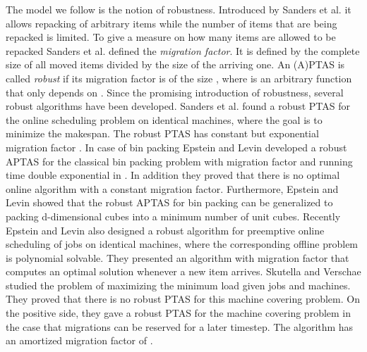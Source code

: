 \documentclass[a4paper,11pt]{article}
\begin{document}
The model we follow is the notion of robustness. Introduced by Sanders et al. \cite{sanders2009} it allows 
repacking of arbitrary items while the number of items that are being repacked is limited. To give a measure 
on how many items are allowed to
be repacked Sanders et al. \cite{sanders2009} defined the \emph{migration factor}.
It is defined by the complete size of all moved items divided by the size of the arriving one.
An (A)PTAS is called \emph{robust} if its migration factor is of the size , where  is
an arbitrary function that only depends on .
Since the promising introduction of robustness, several robust algorithms have been developed.
Sanders et al. \cite{sanders2009} found a robust PTAS for the online scheduling problem  
on identical machines, where the goal is to minimize the makespan. The robust PTAS has
constant but exponential migration factor .
In case of bin packing
Epstein and Levin \cite{epstein2006robust} developed a robust APTAS for the classical bin packing problem
with migration factor  and running time
double exponential in .
In addition they proved that there is no optimal online algorithm with a constant migration factor.
Furthermore, Epstein and Levin \cite{epsteinu} showed that the robust APTAS for bin packing can 
be generalized to packing d-dimensional cubes into a minimum number of unit cubes.
Recently Epstein and Levin \cite{epstein2011} also designed a robust 
algorithm for preemptive online
scheduling of jobs on identical machines, where the corresponding offline problem is polynomial solvable.
They presented an algorithm with migration factor
 that computes an optimal solution whenever a new item arrives.
Skutella and Verschae \cite{skutella2010} studied the problem of maximizing the minimum load given 
 jobs and  machines. They proved that there is no robust PTAS for this machine covering problem.
On the positive side, they gave a robust PTAS for the machine covering problem in the case that
migrations can be reserved for a later timestep. The algorithm has an amortized migration factor of
.
\end{document}
